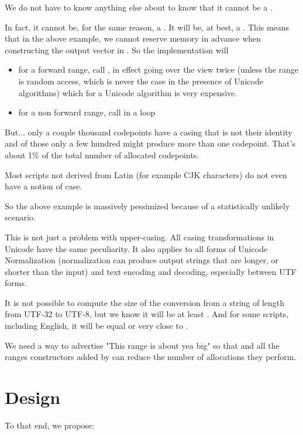 \documentclass{wg21}
\begin{document}
We do not have to know anything else about  to know that it cannot be a .

In fact, it cannot be, for the same reason, a .  It will be, at best, a .
This means that in the above example, we cannot reserve memory in advance when constructing the output vector in .
So the implementation will
\begin{itemize}
\item for a forward range, call , in effect going over the view twice (unless the range is random access, which is never the case in the presence of Unicode algorithms) which for a Unicode algorithm is very expensive.
\item for a non forward range, call  in a loop
\end{itemize}

But... only a couple thousand codepoints have a casing that is not their identity and of those only a few hundred might produce more than
one codepoint. That's about 1\% of the total number of allocated codepoints.

Most scripts not derived from Latin (for example CJK characters) do not even have a notion of case.

So the above example is massively pessimized because of a statistically unlikely scenario.

This is not just a problem with upper-casing. All casing transformations in Unicode have the same peculiarity.
It also applies to all forms of Unicode Normalization (normalization can produce output strings that are longer, or shorter than the input)
and text encoding and decoding, especially between UTF forms.

It is not possible to compute the size of the conversion from a string of length  from UTF-32 to UTF-8, but we know it will be at least .
And for some scripts, including English, it will be equal or very close to .


We need a way to advertise "This range is about yea big" so that  and all the ranges constructors added by 
can reduce the number of allocations they perform.

\section{Design}

To that end, we propose:
\end{document}
